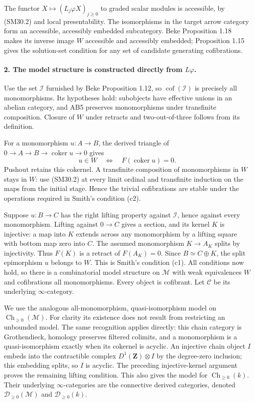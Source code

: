 \documentclass[11pt,a4paper]{article}
\theoremstyle{definition}\newtheorem{definition}[theorem]{Definition}
\theoremstyle{remark}\newtheorem{remark}[theorem]{Remark}
\begin{document}
The functor \(X\mapsto(L_j\varphi X)_{j\ge0}\) to graded
scalar modules is accessible, by (SM30.2) and local
presentability.  The isomorphisms in the target arrow category
form an accessible, accessibly embedded subcategory.
Beke Proposition 1.18 makes its inverse image \(W\) accessible
and accessibly embedded; Proposition 1.15 gives the solution-set
condition for any set of candidate generating cofibrations.

\paragraph{2. The model structure is constructed directly from \(L\varphi\).}
Use the set \(\mathcal I\) furnished by Beke Proposition 1.12,
so \(\operatorname{cof}(\mathcal I)\) is precisely all
monomorphisms.  Its hypotheses hold: subobjects have effective
unions in an abelian category, and AB5 preserves monomorphisms
under transfinite composition.  Closure of \(W\) under retracts
and two-out-of-three follows from its definition.

For a monomorphism \(u:A\to B\), the derived triangle of
\(0\to A\to B\to\operatorname{coker}u\to0\) gives
\[
 u\in W\quad\Longleftrightarrow\quad F(\operatorname{coker}u)=0.
                                                               \tag{SM30.4}
\]
Pushout retains this cokernel.  A transfinite composition of
monomorphisms in \(W\) stays in \(W\): use (SM30.2) at every
limit ordinal and transfinite induction on the maps from the
initial stage.  Hence the trivial cofibrations are stable under
the operations required in Smith's condition (c2).

Suppose \(u:B\to C\) has the right lifting property against
\(\mathcal I\), hence against every monomorphism.  Lifting
against \(0\to C\) gives a section, and its kernel \(K\) is
injective: a map into \(K\) extends across any monomorphism
by a lifting square with bottom map zero into \(C\).
The assumed monomorphism \(K\to A_K\) splits by injectivity.
Thus \(F(K)\) is a retract of \(F(A_K)=0\).
Since \(B\simeq C\oplus K\), the split epimorphism \(u\)
belongs to \(W\).  This is Smith's condition (c1).
All conditions now hold, so there is a combinatorial model
structure on \(\mathcal M\) with weak equivalences \(W\)
and cofibrations all monomorphisms.  Every object is cofibrant.
Let \(\mathcal C\) be its underlying \(\infty\)-category.

We use the analogous all-monomorphism, quasi-isomorphism model
on \(\operatorname{Ch}_{\ge0}(\mathcal M)\).
For clarity its existence does not result from restricting an
unbounded model.  The same recognition applies directly:
this chain category is Grothendieck, homology preserves filtered
colimits, and a monomorphism is a quasi-isomorphism exactly
when its cokernel is acyclic.  An injective chain object \(I\)
embeds into the contractible complex \(D^1(\mathbf Z)\otimes I\)
by the degree-zero inclusion; this embedding splits, so \(I\)
is acyclic.  The preceding injective-kernel argument proves
the remaining lifting condition.  This also gives the model
for \(\operatorname{Ch}_{\ge0}(k)\).
Their underlying \(\infty\)-categories are the connective
derived categories, denoted \(\mathcal D_{\ge0}(\mathcal M)\)
and \(\mathcal D_{\ge0}(k)\).
\end{document}
